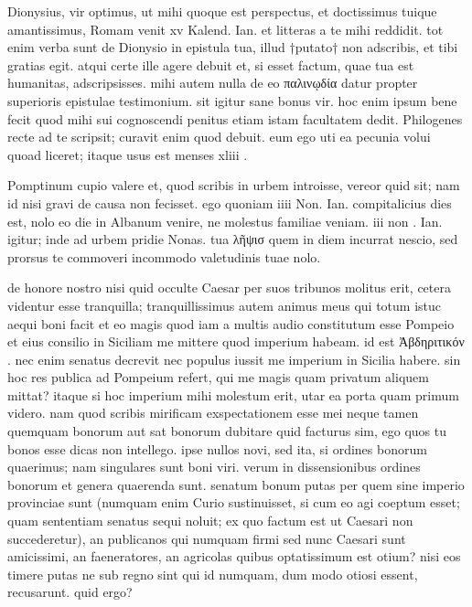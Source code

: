 


 Dionysius, vir optimus, ut mihi quoque est perspectus, et doctissimus tuique amantissimus, Romam venit xv Kalend. Ian. et litteras a te mihi reddidit. tot enim verba sunt de Dionysio in epistula tua, illud †putato† non adscribis, et tibi gratias egit. atqui certe ille agere debuit et, si esset factum, quae tua est humanitas, adscripsisses. mihi autem nulla de eo παλινῳδία datur propter superioris epistulae testimonium. sit igitur sane bonus vir. hoc enim ipsum bene fecit quod mihi sui cognoscendi penitus etiam istam facultatem dedit. Philogenes recte ad te scripsit; curavit enim quod debuit. eum ego uti ea pecunia volui quoad liceret; itaque usus est menses xliii .

 Pomptinum cupio valere et, quod scribis in urbem introisse, vereor quid sit; nam id nisi gravi de causa non fecisset. ego quoniam iiii Non. Ian. compitalicius dies est, nolo eo die in Albanum venire, ne molestus familiae veniam. iii non . Ian. igitur; inde ad urbem pridie Nonas. tua λῆψισ quem in diem incurrat nescio, sed prorsus te commoveri incommodo valetudinis tuae nolo.

 de honore nostro nisi quid occulte Caesar per suos tribunos molitus erit, cetera videntur esse tranquilla; tranquillissimus autem animus meus qui totum istuc aequi boni facit et eo magis quod iam a multis audio constitutum esse Pompeio et eius consilio in Siciliam me mittere quod imperium habeam. id est Ἀβδηριτικόν . nec enim senatus decrevit nec populus iussit me imperium in Sicilia habere. sin hoc res publica ad Pompeium refert, qui me magis quam privatum aliquem mittat? itaque si hoc imperium mihi molestum erit, utar ea porta quam primum videro. nam quod scribis mirificam exspectationem esse mei neque tamen quemquam bonorum aut sat bonorum dubitare quid facturus sim, ego quos tu bonos esse dicas non intellego. ipse nullos novi, sed ita, si ordines bonorum quaerimus; nam singulares sunt boni viri. verum in dissensionibus ordines bonorum et genera quaerenda sunt. senatum bonum putas per quem sine imperio provinciae sunt (numquam enim Curio sustinuisset, si cum eo agi coeptum esset; quam sententiam senatus sequi noluit; ex quo factum est ut Caesari non succederetur), an publicanos qui numquam firmi sed nunc Caesari sunt amicissimi, an faeneratores, an agricolas quibus optatissimum est otium? nisi eos timere putas ne sub regno sint qui id numquam, dum modo otiosi essent, recusarunt. quid ergo?

